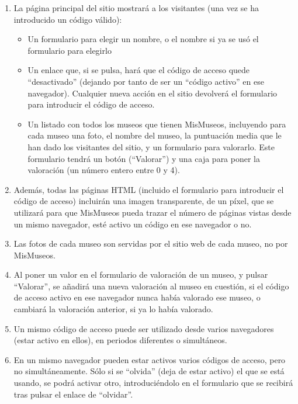 \begin{enumerate}
\item La página principal del sitio mostrará a los visitantes (una vez se ha introducido un código válido):
  \begin{itemize}
  \item Un formulario para elegir un nombre, o el nombre si ya se usó el formulario para elegirlo
  \item Un enlace que, si se pulsa, hará que el código de acceso quede ``desactivado'' (dejando por tanto de ser un ``código activo'' en ese navegador). Cualquier nueva acción en el sitio devolverá el formulario para introducir el código de acceso.
  \item Un listado con todos los museos que tienen MisMuseos, incluyendo para cada museo una foto, el nombre del museo, la puntuación media que le han dado los visitantes del sitio, y un formulario para valorarlo. Este formulario tendrá un botón (``Valorar'') y una caja para poner la valoración (un número entero entre 0 y 4).
  \end{itemize}

\item Además, todas las páginas HTML (incluido el formulario para introducir el código de acceso) incluirán una imagen transparente, de un píxel, que se utilizará para que MisMuseos pueda trazar el número de páginas vistas desde un mismo navegador, esté activo un código en ese navegador o no.

\item Las fotos de cada museo son servidas por el sitio web de cada museo, no por MisMuseos.

\item Al poner un valor en el formulario de valoración de un museo, y pulsar ``Valorar'', se añadirá una nueva valoración al museo en cuestión, si el código de acceso activo en ese navegador nunca había valorado ese museo, o cambiará la valoración anterior, si ya lo había valorado.

\item Un mismo código de acceso puede ser utilizado desde varios navegadores (estar activo en ellos), en periodos diferentes o simultáneos.

\item En un mismo navegador pueden estar activos varios códigos de acceso, pero  no simultáneamente. Sólo si se ``olvida'' (deja de estar activo) el que se está usando, se podrá activar otro, introduciéndolo en el formulario que se recibirá tras pulsar el enlace de ``olvidar''.

\end{enumerate}


